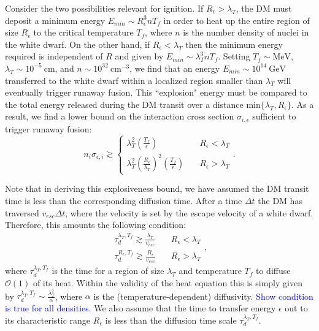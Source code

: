 \documentclass[twocolumn,showpacs,preprintnumbers,amsmath,amssymb,prl]{revtex4}
\newcommand{\OO}{\mathcal{O}}
\def\r{\right)}
\def\l{\left(}
\begin{document}
Consider the two possibilities relevant for ignition. If $R_\epsilon> \lambda_T$, the DM must deposit a minimum energy $E_{min} \sim R_\epsilon^3 n T_f$ in order to heat up the entire region of size $R_\epsilon$ to the critical temperature $T_f$, where $n$ is the number density of nuclei in the white dwarf. On the other hand, if $R_\epsilon < \lambda_T$ then the minimum energy required is independent of $R$ and given by $E_{min} \sim \lambda_T^3 n T_f$. Setting $T_f \sim \text{MeV}$, $\lambda_T \sim 10^{-5} ~\text{cm}$, and $n \sim 10^{32} ~\text{cm}^{-3}$, we find that an energy $E_{min} \sim 10^{14} ~\text{GeV}$ transferred to the white dwarf within a localized region smaller than $\lambda_T$ will eventually trigger runaway fusion. This ``explosion" energy must be compared to the total energy released during the DM transit over a distance $\text{min}\{\lambda_T, R_\epsilon\}$. As a result, we find a lower bound on the interaction cross section $\sigma_{i,\epsilon}$ sufficient to trigger runaway fusion: 
\begin{equation}
\label{eq:explosion}
n_i \sigma_{\epsilon,i} \gtrsim \left\{
        \begin{array}{ll}
            \displaystyle \lambda_T^2 \l \frac{T_f}{\epsilon} \r & \quad R_\epsilon < \lambda_T \\
             \lambda_T^2 \l \frac{R_\epsilon}{\lambda_T}\r^2 \l \frac{T_f}{\epsilon} \r & \quad R_\epsilon > \lambda_T
        \end{array}
    \right..
\end{equation}

Note that in deriving this explosiveness bound, we have assumed the DM transit time is less than the corresponding diffusion time. After a time $\Delta t$ the DM has traversed $v_{esc} \Delta t$, where the velocity is set by the escape velocity of a white dwarf. Therefore, this amounts the following condition:
\begin{equation}
\begin{array}{ll}
             \tau_d^{\lambda_T, T_f} \gtrsim \frac{\lambda_T}{v_{esc}} & \quad R_\epsilon < \lambda_T \\
            \tau_d^{R_\epsilon, T_f} \gtrsim \frac{R_\epsilon}{v_{esc}}  & \quad R_\epsilon > \lambda_T
        \end{array},
\end{equation}
where $\tau_d^{\lambda_T, T_f}$ is the time for a region of size $\lambda_T$ and temperature $T_f$ to diffuse $\OO(1)$ of its heat. Within the validity of the heat equation this is simply given by $\tau_d^{\lambda_T, T_f} \sim \frac{\lambda_T^2}{\alpha}$, where $\alpha$ is the (temperature-dependent) diffusivity. \textcolor{blue}{Show condition is true for all densities.} We also assume that the time to transfer energy $\epsilon$ out to its characteristic range $R_\epsilon$ is less than the diffusion time scale $\tau_d^{\lambda_T, T_f}$. 
\end{document}
